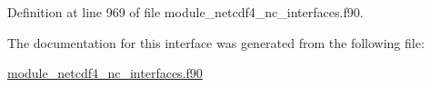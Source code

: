 Definition at line 969 of file module\+\_\+netcdf4\+\_\+nc\+\_\+interfaces.\+f90.



The documentation for this interface was generated from the following file\+:\begin{DoxyCompactItemize}
\item 
\hyperlink{module__netcdf4__nc__interfaces_8f90}{module\+\_\+netcdf4\+\_\+nc\+\_\+interfaces.\+f90}\end{DoxyCompactItemize}
